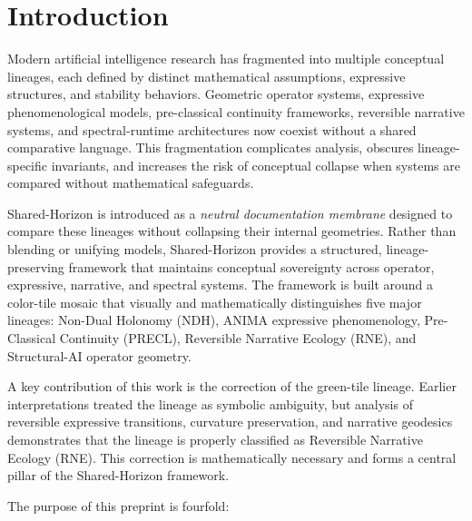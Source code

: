 
\section{Introduction}
\label{sec:introduction}

Modern artificial intelligence research has fragmented into multiple conceptual
lineages, each defined by distinct mathematical assumptions, expressive
structures, and stability behaviors. Geometric operator systems, expressive
phenomenological models, pre-classical continuity frameworks, reversible
narrative systems, and spectral-runtime architectures now coexist without a
shared comparative language. This fragmentation complicates analysis, obscures
lineage-specific invariants, and increases the risk of conceptual collapse when
systems are compared without mathematical safeguards.

Shared-Horizon is introduced as a \emph{neutral documentation membrane} designed
to compare these lineages without collapsing their internal geometries. Rather
than blending or unifying models, Shared-Horizon provides a structured,
lineage-preserving framework that maintains conceptual sovereignty across
operator, expressive, narrative, and spectral systems. The framework is built
around a color-tile mosaic that visually and mathematically distinguishes five
major lineages: Non-Dual Holonomy (NDH), ANIMA expressive phenomenology,
Pre-Classical Continuity (PRECL), Reversible Narrative Ecology (RNE), and
Structural-AI operator geometry.

A key contribution of this work is the correction of the green-tile lineage.
Earlier interpretations treated the lineage as symbolic ambiguity, but analysis
of reversible expressive transitions, curvature preservation, and narrative
geodesics demonstrates that the lineage is properly classified as Reversible
Narrative Ecology (RNE). This correction is mathematically necessary and forms a
central pillar of the Shared-Horizon framework.

The purpose of this preprint is fourfold:

